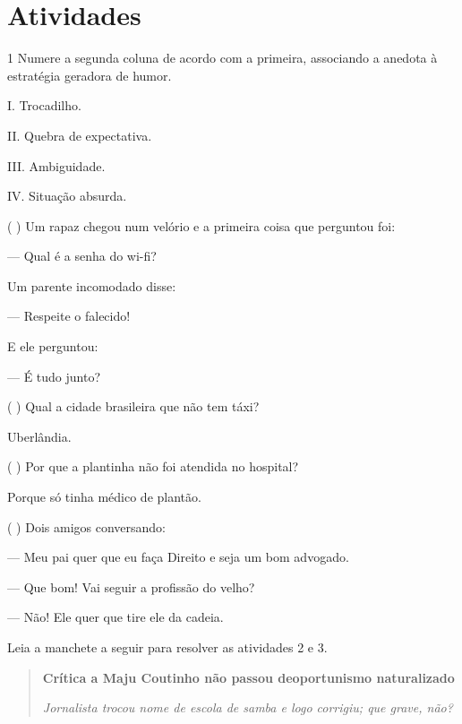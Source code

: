 \section{Atividades}

\num{1} Numere a segunda coluna de acordo com a primeira, associando a
anedota à estratégia geradora de humor.

\begin{multicols}{2}

I. Trocadilho.

II. Quebra de expectativa.

III. Ambiguidade.

IV. Situação absurda.

\columnbreak

(  ) Um rapaz chegou num velório e a primeira coisa que perguntou foi:

--- Qual é a senha do wi-fi?

Um parente incomodado disse:

--- Respeite o falecido!

E ele perguntou:

--- É tudo junto?


(  ) Qual a cidade brasileira que não tem táxi?

Uberlândia.


(  ) Por que a plantinha não foi atendida no hospital?

Porque só tinha médico de plantão.


(  ) Dois amigos conversando:

--- Meu pai quer que eu faça Direito e seja um bom advogado.

--- Que bom! Vai seguir a profissão do velho?

--- Não! Ele quer que tire ele da cadeia.
\end{multicols}


Leia a manchete a seguir para resolver as atividades 2 e 3.

\begin{quote}
\textbf{Crítica a Maju Coutinho não passou deoportunismo naturalizado}

\emph{Jornalista trocou nome de escola de samba e logo corrigiu; que
grave, não?}

\end{quote}


